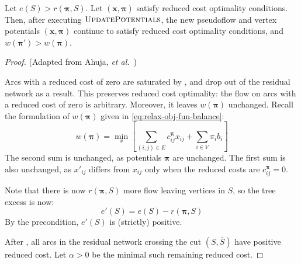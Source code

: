\begin{lemma} \label{lemma:relax-correctness-updatepotentials}
    Let $e(S) > r(\boldsymbol{\pi},S)$. Let $\left(\mathbf{x},\boldsymbol{\pi}\right)$ satisfy reduced cost optimality conditions. Then, after executing $\textproc{UpdatePotentials}$, the new pseudoflow and vertex potentials $\left(\mathbf{x},\boldsymbol{\pi}\right)$ continue to satisfy reduced cost optimality conditions, and $w(\boldsymbol{\pi}') > w(\boldsymbol{\pi})$.
\end{lemma}
\begin{proof} (Adapted from Ahuja, \textit{et al.}~\cite[p.~334]{Ahuja:1993})
    
    Arcs with a reduced cost of zero are saturated by , and drop out of the residual network as a result. This preserves reduced cost optimality: the flow on arcs with a reduced cost of zero is arbitrary. Moreover, it leaves $w(\boldsymbol{\pi})$ unchanged. Recall the formulation of $w(\boldsymbol{\pi})$ given in \cref{eq:relax-obj-fun-balance}:
    \[w(\boldsymbol{\pi})=\min_{x}\left[\sum_{\left(i,j\right)\in E}c_{ij}^{\boldsymbol{\pi}}x_{ij}+\sum_{i\in V}\pi_{i}b_{i}\right]\]
    The second sum is unchanged, as potentials $\boldsymbol{\pi}$ are unchanged. The first sum is also unchanged, as $x'_{ij}$ differs from $x_{ij}$ only when the reduced costs are $c_{ij}^{\boldsymbol{\pi}}=0$.
    
    Note that there is now $r(\boldsymbol{\pi},S)$ more flow leaving vertices in $S$, so the tree excess is now:
    \[e'(S) = e(S) - r(\boldsymbol{\pi},S)\]
    By the precondition, $e'(S)$ is (strictly) positive.
    
    After , all arcs in the residual network crossing the cut $\left(S,\overline{S}\right)$ have positive reduced cost\footnotemark. Let $\alpha > 0$ be the minimal such remaining reduced cost.
    

\end{proof}
